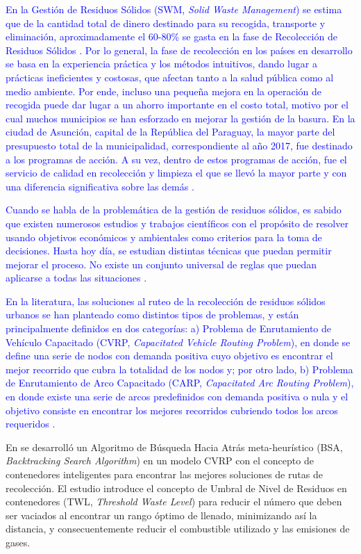 \documentclass[spanish, conference]{IEEEtran}
\begin{document}
{\textcolor{blue}{En la Gestión de Residuos Sólidos (SWM, \textit{Solid Waste Management}) se estima que de la cantidad total de dinero destinado para su recogida, transporte y eliminación, aproximadamente el 60-80\% se gasta en la fase de Recolección de Residuos Sólidos \cite{Tavares2009OptimisationModelling} \cite{Dogan2003Report:Istanbul}. Por lo general, la fase de recolección en los países en desarrollo se basa en la experiencia práctica y los métodos intuitivos, dando lugar a prácticas ineficientes y costosas, que afectan tanto a la salud pública como al medio ambiente. Por ende, incluso una pequeña mejora en la operación de recogida puede dar lugar a un ahorro importante en el costo total, motivo por el cual muchos municipios se han esforzado en mejorar la gestión de la basura. En la ciudad de Asunción, capital de la República del Paraguay, la mayor parte del presupuesto total de la municipalidad, correspondiente al año 2017, fue destinado a los programas de acción. A su vez, dentro de estos programas de acción, fue el servicio de calidad en recolección y limpieza el que se llevó la mayor parte y con una diferencia significativa sobre las demás  \cite{MunicipalidaddeAsuncion2017Presupuesto2017}.}

\textcolor{blue}{Cuando se habla de la problemática de la gestión de residuos sólidos, es sabido que existen numerosos estudios y trabajos científicos con el propósito de resolver usando objetivos económicos y ambientales como criterios para la toma de decisiones. Hasta hoy día, se estudian distintas técnicas que puedan permitir mejorar el proceso. No existe un conjunto universal de reglas que puedan aplicarse a todas las situaciones \cite{Tchobanoglous1993IntegratedIssues}.}

\textcolor{blue}{En la literatura, las soluciones al ruteo de la recolección de residuos sólidos urbanos se han planteado como distintos tipos de problemas, y están principalmente definidos en dos categorías: a) Problema de Enrutamiento de Vehículo Capacitado (CVRP, \textit{Capacitated Vehicle Routing Problem}), en donde se define una serie de nodos con demanda positiva cuyo objetivo es encontrar el mejor recorrido que cubra la totalidad de los nodos y; por otro lado, b) Problema de Enrutamiento de Arco Capacitado (CARP, \textit{Capacitated Arc Routing Problem}), en donde existe una serie de arcos predefinidos con demanda positiva o nula y el objetivo consiste en encontrar los mejores recorridos cubriendo todos los arcos requeridos \cite{Tirkolaee2018ATime}.}

En \cite{Akhtar2017BacktrackingOptimization} se desarrolló un Algoritmo de Búsqueda Hacia Atrás meta-heurístico (BSA, \textit{Backtracking Search Algorithm}) en un modelo CVRP con el concepto de contenedores inteligentes para encontrar las mejores soluciones de rutas de recolección. El estudio introduce el concepto de Umbral de Nivel de Residuos en contenedores (TWL, \textit{Threshold Waste Level}) para reducir el número que deben ser vaciados al encontrar un rango óptimo de llenado, minimizando así la distancia, y consecuentemente reducir el combustible utilizado y las emisiones de gases.

}
\end{document}
